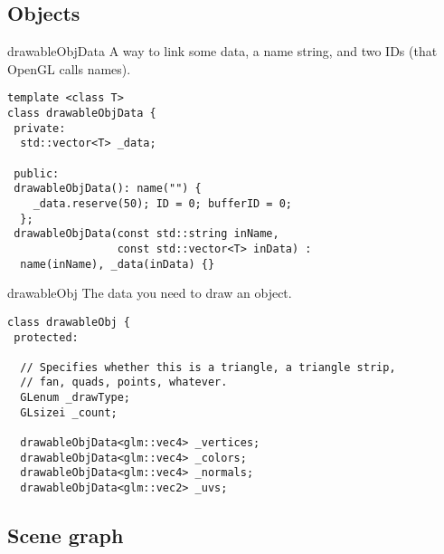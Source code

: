 \documentclass[12pt]{article}
\begin{document}
\subsection{Objects}

\begin{frame}[fragile]{drawableObjData}
A way to link some data, a name string, and two IDs (that OpenGL calls names).
\begin{verbatim}
template <class T>
class drawableObjData {
 private:
  std::vector<T> _data;

 public:
 drawableObjData(): name("") {
    _data.reserve(50); ID = 0; bufferID = 0;
  };
 drawableObjData(const std::string inName,
                 const std::vector<T> inData) :
  name(inName), _data(inData) {}
\end{verbatim}
\end{frame}

\begin{frame}[fragile]{drawableObj}
The data you need to draw an object.

\begin{verbatim}
class drawableObj {
 protected:

  // Specifies whether this is a triangle, a triangle strip,
  // fan, quads, points, whatever.
  GLenum _drawType;
  GLsizei _count;

  drawableObjData<glm::vec4> _vertices;
  drawableObjData<glm::vec4> _colors;
  drawableObjData<glm::vec4> _normals;
  drawableObjData<glm::vec2> _uvs;
\end{verbatim}
\end{frame}

\subsection{Scene graph}
\end{document}
